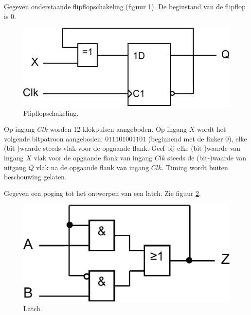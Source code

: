 \documentclass[a4paper,12pt,addpoints,fleqn,dutch]{tisdexam}
\begin{document}
\begin{questions}
\newpage

\question[10]
\label{opg:opg6}
Gegeven onderstaande flipflopschakeling (figuur \ref{fig:opg6}). De beginstand van de
flipflop is 0.

\begin{figure}[H]
  \centering
  \includegraphics[scale=0.63]{pINLDIG2014_opgave6_schema.pdf}
  \caption{Flipflopschakeling.}
  \label{fig:opg6}
\end{figure}

Op ingang $Clk$ worden 12 klokpulsen aangeboden. Op ingang $X$ wordt het
volgende bitpatroon aangeboden: $011101001101$ (beginnend met de linker $0$),
elke (bit-)waarde steeds vlak
voor de opgaande flank. Geef bij elke (bit-)waarde van ingang $X$ vlak voor de
opgaande flank van ingang $Clk$ steeds de (bit-)waarde van uitgang $Q$ vlak na
de opgaande flank van ingang $Clk$. Timing wordt buiten beschouwing gelaten.



\question
\label{opg:opg7}
Gegeven een poging tot het ontwerpen van een latch. Zie figuur \ref{fig:opg7}.

\begin{figure}[H]
  \centering
  \includegraphics[scale=0.63]{pINLDIG2014_opgave7_schema.pdf}
  \caption{Latch.}
  \label{fig:opg7}
\end{figure}

\end{questions}
\end{document}
